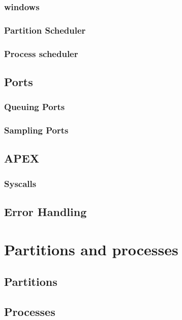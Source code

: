 \subsubsection{windows}

\subsubsection{Partition Scheduler}

\subsubsection{Process scheduler}


\subsection{Ports}

\subsubsection{Queuing Ports}
\subsubsection{Sampling Ports}


\subsection{APEX}

\subsubsection{Syscalls}


\subsection{Error Handling}


\section{Partitions and processes}

\subsection{Partitions}

\subsection{Processes}

